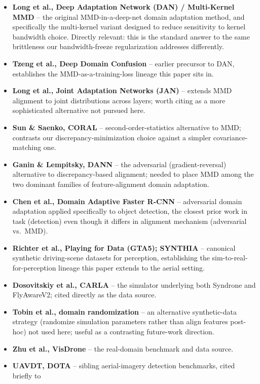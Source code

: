 \documentclass[11pt]{article}
\begin{document}
\begin{itemize}
    \item \textbf{Long et al., Deep Adaptation Network (DAN) / Multi-Kernel MMD} -- the
    original MMD-in-a-deep-net domain adaptation method, and specifically the multi-kernel
    variant designed to reduce sensitivity to kernel bandwidth choice. Directly relevant: this
    is the standard answer to the same brittleness our bandwidth-freeze regularization
    addresses differently.
    \item \textbf{Tzeng et al., Deep Domain Confusion} -- earlier precursor to DAN, establishes
    the MMD-as-a-training-loss lineage this paper sits in.
    \item \textbf{Long et al., Joint Adaptation Networks (JAN)} -- extends MMD alignment to
    joint distributions across layers; worth citing as a more sophisticated alternative not
    pursued here.
    \item \textbf{Sun \& Saenko, CORAL} -- second-order-statistics alternative to MMD;
    contrasts our discrepancy-minimization choice against a simpler covariance-matching one.
    \item \textbf{Ganin \& Lempitsky, DANN} -- the adversarial (gradient-reversal) alternative
    to discrepancy-based alignment; needed to place MMD among the two dominant families of
    feature-alignment domain adaptation.
    \item \textbf{Chen et al., Domain Adaptive Faster R-CNN} -- adversarial domain adaptation
    applied specifically to object detection, the closest prior work in task (detection) even
    though it differs in alignment mechanism (adversarial vs.\ MMD).
    \item \textbf{Richter et al., Playing for Data (GTA5); SYNTHIA} -- canonical synthetic
    driving-scene datasets for perception, establishing the sim-to-real-for-perception lineage
    this paper extends to the aerial setting.
    \item \textbf{Dosovitskiy et al., CARLA} -- the simulator underlying both Syndrone and
    FlyAwareV2; cited directly as the data source.
    \item \textbf{Tobin et al., domain randomization} -- an alternative synthetic-data strategy
    (randomize simulation parameters rather than align features post-hoc) not used here; useful
    as a contrasting future-work direction.
    \item \textbf{Zhu et al., VisDrone} -- the real-domain benchmark and data source.
    \item \textbf{UAVDT, DOTA} -- sibling aerial-imagery detection benchmarks, cited briefly to

\end{itemize}
\end{document}
